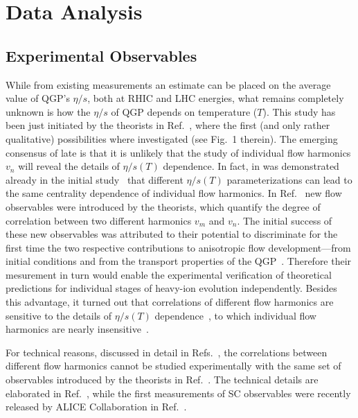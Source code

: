 
\section{Data Analysis}
\label{sec:method}
\subsection{Experimental Observables}

While from existing measurements an estimate can be placed on the average value of QGP's $\eta/s$, both at RHIC and LHC energies, what remains completely unknown is how the $\eta/s$ of QGP depends on temperature ($T$). This study has been just initiated by the theorists in Ref.~\cite{Niemi:2015qia}, where the first (and only rather qualitative) possibilities where investigated (see Fig.~1 therein). The emerging consensus of late is that it is unlikely that the study of individual flow harmonics $v_n$ will reveal the details of $\eta/s(T)$ dependence. In fact, in was demonstrated already in the initial study~\cite{Niemi:2015qia} that different $\eta/s(T)$ parameterizations can lead to the same centrality dependence of individual flow harmonics. In Ref.~\cite{Niemi:2012aj} new flow observables were introduced by the theorists, which quantify the degree of correlation between two different harmonics $v_m$ and $v_n$. The initial success of these new observables was attributed to their potential to discriminate for the first time the two respective contributions to anisotropic flow development---from initial conditions and from the transport properties of the QGP~\cite{Niemi:2012aj}. Therefore their mesurement in turn would enable the experimental verification of theoretical predictions for individual stages of heavy-ion evolution independently. Besides this advantage, it turned out that correlations of different flow harmonics are sensitive to the details of $\eta/s(T)$ dependence~\cite{ALICE:2016kpq}, to which individual flow harmonics are nearly insensitive~\cite{Niemi:2015qia}. 
 
For technical reasons, discussed in detail in Refs.~\cite{ALICE:2016kpq,Bilandzic:2013kga}, the correlations between different flow harmonics cannot be studied experimentally with the same set of observables introduced by the theorists in Ref.~\cite{Niemi:2012aj}. The technical details are elaborated in Ref.~\cite{Bilandzic:2013kga}, while the first measurements of SC observables were recently released by ALICE Collaboration in Ref.~\cite{ALICE:2016kpq}.

